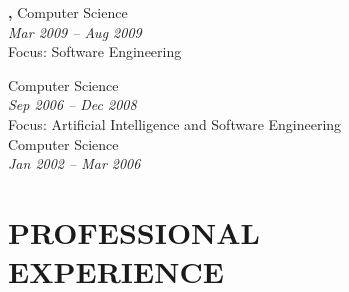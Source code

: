 \documentclass[margin, 10pt]{res} %
\begin{document}
\begin{resume}
{\bf \color{Black}{Exchange Student},} Computer Science \\
{\color{RubineRed}{University of Limerick, Ireland}} \hfill \textit{Mar 2009 -- Aug 2009} \\
Focus: Software Engineering 

{\bf \color{Black}{Master of Science,}} Computer Science \\ %
{\color{RubineRed}{Lahore University of Management Sciences, Pakistan}} \hfill \textit{Sep 2006 -- Dec 2008} \\
Focus: Artificial Intelligence and Software Engineering \\

{\bf \color{Black}{Bachelor of Science,}} Computer Science \\ %
{\color{RubineRed}{University of Peshawar, Pakistan}} \hfill \textit{Jan 2002 -- Mar 2006} \\


\section{PROFESSIONAL \\ EXPERIENCE}


\end{resume}
\end{document}
